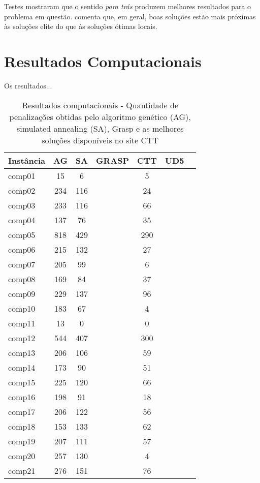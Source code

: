 \documentclass[11pt]{article}
\begin{document}
Testes mostraram que o sentido \textit{para trás} produzem melhores resultados para o problema em questão. \cite{grasp_resende_ribeiro} comenta que, em geral, boas soluções estão mais próximas às soluções elite do que às soluções ótimas locais.




\section{Resultados Computacionais}
\label{sec:resultados}

Os resultados...

\begin{table}

\centering
\begin{tabular}{|l|c|c|c|c|c|c|} 
\hline

Instância & AG & SA & GRASP & CTT & UD5 \\ \hline

comp01 & 15 & 6 & & 5 & \\
comp02 & 234 & 116 & & 24 & \\
comp03 & 233 & 116 &  & 66 & \\
comp04 & 137 & 76 & & 35 & \\
comp05 & 818 & 429 & & 290 & \\
comp06 & 215 & 132 & & 27 & \\
comp07 & 205 & 99 & & 6 & \\
comp08 & 169 & 84 & & 37 & \\
comp09 & 229 & 137 & & 96 & \\
comp10 & 183 & 67 & & 4 & \\
comp11 & 13 & 0 & & 0 & \\
comp12 & 544 & 407 & & 300 & \\
comp13 & 206 & 106 & & 59 & \\
comp14 & 173 & 90 & & 51 & \\
comp15 & 225 & 120 & & 66 & \\
comp16 & 198 & 91 & & 18 & \\
comp17 & 206 & 122 & & 56 & \\
comp18 & 153 & 133 & & 62 & \\
comp19 & 207 & 111 & & 57 & \\
comp20 & 257 & 130 & & 4 & \\
comp21 & 276 & 151 & & 76 & \\

\hline
\end{tabular}
\caption{Resultados computacionais - Quantidade de penalizações obtidas pelo algoritmo genético (AG), simulated annealing (SA), Grasp e as melhores soluções disponíveis no site CTT}
\label{tabResultados}
\end{table} 
\end{document}
